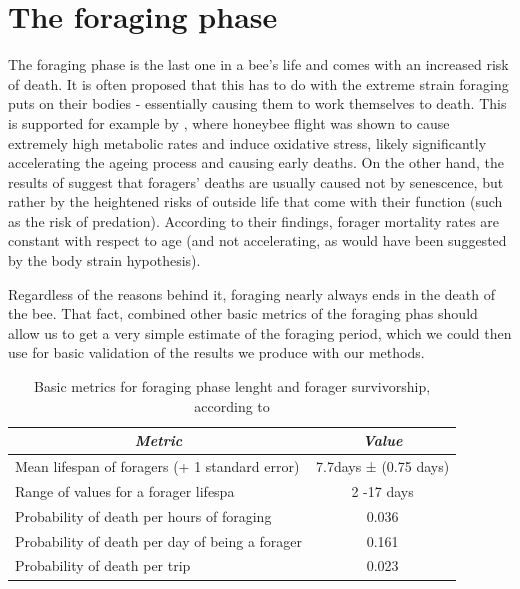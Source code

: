 \section{The foraging phase}
The foraging phase is the last one in a bee’s life and comes with an increased
risk of death. It is often proposed that this has to do with the extreme strain
foraging puts on their bodies - essentially causing them to work themselves to
death. This is supported for example by \citep{williams_age_2008},
where honeybee flight was shown to cause extremely high metabolic
rates and induce oxidative stress, likely significantly accelerating the ageing
process and causing early deaths. On the other hand, the results of
\citep{visscher_survivorship_1997} suggest that foragers’ deaths are usually
caused not by senescence, but rather by the heightened risks of outside life
that come with their function (such as the risk of predation). According to
their findings, forager mortality rates are constant with respect to age (and
not accelerating, as would have been suggested by the body strain hypothesis). 

Regardless of the reasons behind it, foraging nearly always ends in the death of
the bee. That fact, combined other basic metrics of the foraging phas should allow 
us to get a very simple estimate of the foraging period, which we could then use for
basic validation of the results we produce with our methods.

\begin{table}[h]
\centering
\caption{Basic metrics for foraging phase lenght and forager survivorship, according to \cite{visscher_survivorship_1997}}
\begin{tabular}{|l|c|}
\hline
\multicolumn{1}{|c|}{\textit{Metric}}                    & \textit{Value}\\ \hline
Mean lifespan of foragers (+ 1 standard error)  & 7.7days ± (0.75 days) \\ \hline
Range of values for a forager lifespa           & 2 -17 days            \\ \hline
Probability of death per hours of foraging      & 0.036                 \\ \hline
Probability of death per day of being a forager & 0.161                 \\ \hline
Probability of death per trip                   & 0.023                 \\ \hline
\end{tabular}
\end{table}

